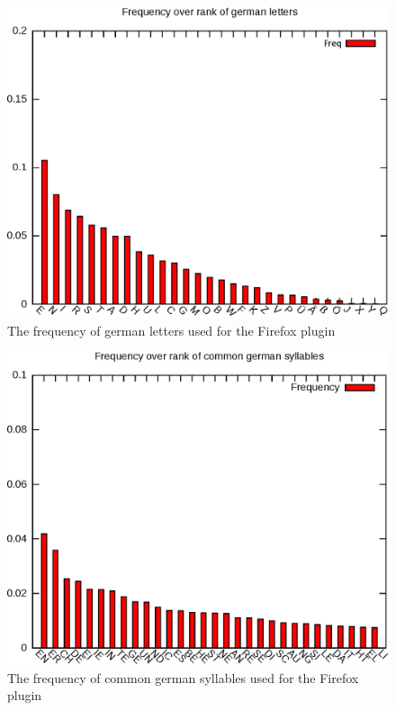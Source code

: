 \begin{frame}[c]
\begin{figure}[htp]
\begin{center}
  \includegraphics[width=1\textheight]{graphics/letters_de}
  \caption[fig:letters_de]{The frequency of german letters used
  for the Firefox plugin}
  \label{figureLabel}
\end{center}
\end{figure}

\end{frame}

\begin{frame}[c]

\begin{figure}[htp]
\begin{center}
  \includegraphics[width=1\textheight]{graphics/syllables_de}
  \caption[fig:letters_de]{The frequency of common german syllables used for the Firefox plugin}
  \label{figureLabel}
\end{center}
\end{figure}

\end{frame}


